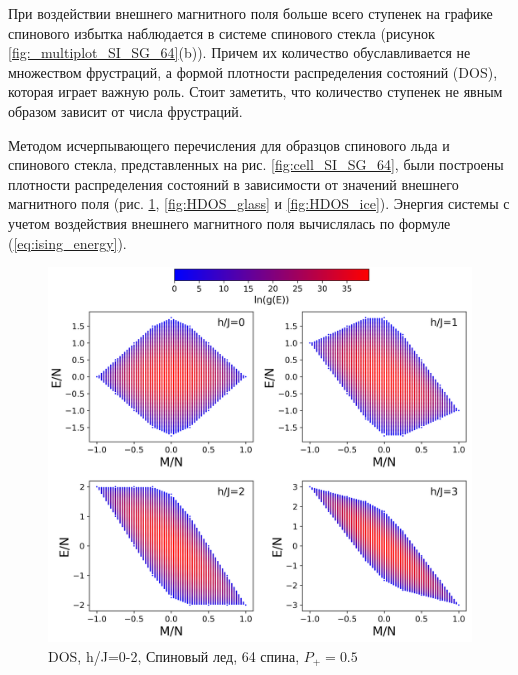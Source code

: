 \documentclass[utf8, babel, sor, jor, amsmath, amssymb, reprint]{elsarticle} %
\begin{document}
При воздействии внешнего магнитного поля больше всего ступенек на графике спинового избытка наблюдается в системе спинового стекла (рисунок \ref{fig:_multiplot_SI_SG_64}(b)). Причем их количество обуславливается не множеством фрустраций, а формой плотности распределения состояний (DOS), которая играет важную роль.
Стоит заметить, что количество ступенек не явным образом зависит от числа фрустраций.


Методом исчерпывающего перечисления для образцов спинового льда и спинового стекла, представленных на рис. \ref{fig:cell_SI_SG_64}, были построены плотности распределения состояний в зависимости от значений внешнего магнитного поля (рис. \ref{fig:HDOS_ice_1}, \ref{fig:HDOS_glass} и \ref{fig:HDOS_ice}).
Энергия системы с учетом воздействия внешнего магнитного поля вычислялась по формуле (\ref{eq:ising_energy}).




\begin{figure}[H]
	\centering
	\includegraphics[width=1\linewidth]{pictures/HDOS_SI_64_J0_1.png}
	\caption{DOS, h/J=0-2, Спиновый лед, 64 спина, $P_+ = 0.5$}
	\label{fig:HDOS_ice_1}
\end{figure}
\end{document}
